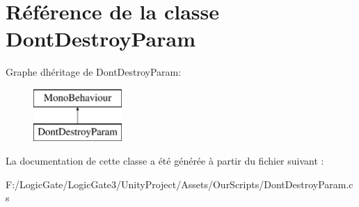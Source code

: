 \hypertarget{class_dont_destroy_param}{}\section{Référence de la classe Dont\+Destroy\+Param}
\label{class_dont_destroy_param}
Graphe d\textquotesingle{}héritage de Dont\+Destroy\+Param\+:\begin{figure}[H]
\begin{center}
\leavevmode
\includegraphics[height=2.000000cm]{class_dont_destroy_param}
\end{center}
\end{figure}


La documentation de cette classe a été générée à partir du fichier suivant \+:\begin{DoxyCompactItemize}
\item 
F\+:/\+Logic\+Gate/\+Logic\+Gate3/\+Unity\+Project/\+Assets/\+Our\+Scripts/Dont\+Destroy\+Param.\+cs\end{DoxyCompactItemize}
